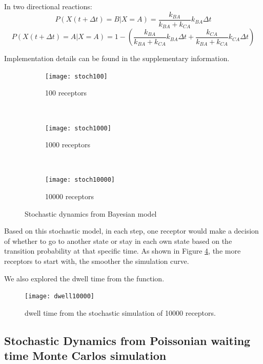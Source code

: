 \documentclass[fleqn,10pt]{wlscirep}
\begin{document}
In two directional reactions:
\begin{equation}
P(X(t+\Delta t)=B | X=A) = \frac{k_{BA}}{k_{BA}+k_{CA}}k_{BA}\Delta t
\end{equation}
\begin{equation}
P(X(t+\Delta t)=A | X=A) = 1 - (\frac{k_{BA}}{k_{BA}+k_{CA}}k_{BA}\Delta t + \frac{k_{CA}}{k_{BA}+k_{CA}}k_{CA}\Delta t)
\end{equation}

Implementation details can be found in the supplementary information.

\begin{figure}
    \centering
    \begin{subfigure}[b]{0.3\textwidth}
        \texttt{[image: stoch100]}
        \caption{100 receptors}
        \label{fig:stoch100}
    \end{subfigure}
    ~ 
    \begin{subfigure}[b]{0.3\textwidth}
        \texttt{[image: stoch1000]}
        \caption{1000 receptors}
        \label{fig:stoch1000}
    \end{subfigure}
    ~ 
    \begin{subfigure}[b]{0.3\textwidth}
        \texttt{[image: stoch10000]}
        \caption{10000 receptors}
        \label{fig:stoch10000}
    \end{subfigure}
    \caption{Stochastic dynamics from Bayesian model}
    \label{fig:stochsim}
\end{figure}

Based on this stochastic model, in each step, one receptor would make a decision of whether to go to another state or stay in each own state based on the transition probability at that specific time. As shown in Figure \ref{fig:stochsim}, the more receptors to start with, the smoother the simulation curve.

We also explored the dwell time from the function. 

\begin{figure}[ht]
\centering
\texttt{[image: dwell10000]}
\caption{dwell time from the stochastic simulation of 10000 receptors.}
\label{fig:dwell10000} 
\end{figure}

\subsection*{Stochastic Dynamics from Poissonian waiting time Monte Carlos simulation}
\end{document}
